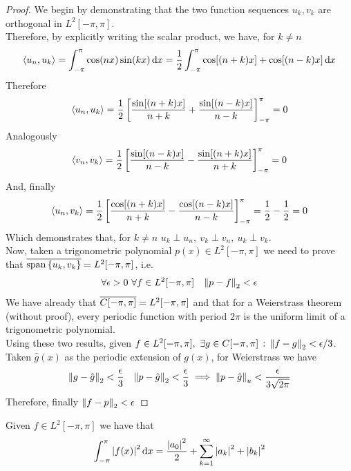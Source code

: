 \documentclass[../complete.tex]{subfiles}
\begin{document}
\begin{proof}
	We begin by demonstrating that the two function sequences $u_k,v_k$ are orthogonal in $L^2[-\pi,\pi]$.\\
	Therefore, by explicitly writing the scalar product, we have, for $k\ne n$
	\begin{equation*}
		\spr{u_n}{u_k}=\int_{-\pi}^{\pi}\cos(nx)\sin(kx)\diff x=\frac{1}{2}\int_{-\pi}^{\pi}\cos[(n+k)x]+\cos[(n-k)x]\diff x
	\end{equation*}
	Therefore
	\begin{equation*}
		\spr{u_n}{u_k}=\frac{1}{2}\left[ \frac{\sin[(n+k)x]}{n+k}+\frac{\sin[(n-k)x]}{n-k} \right]^\pi_{-\pi}=0
	\end{equation*}
	Analogously
	\begin{equation*}
		\spr{v_n}{v_k}=\frac{1}{2}\left[ \frac{\sin[(n-k)x]}{n-k}-\frac{\sin[(n+k)x]}{n+k} \right]^\pi_{-\pi}=0
	\end{equation*}
	And, finally
	\begin{equation*}
		\spr{u_n}{v_k}=\frac{1}{2}\left[ \frac{\cos[(n+k)x]}{n+k}-\frac{\cos[(n-k)x]}{n-k} \right]^{\pi}_{-\pi}=\frac{1}{2}-\frac{1}{2}=0
	\end{equation*}
	Which demonstrates that, for $k\ne n$ $u_k\perp u_n,\ v_k\perp v_n,\ u_k\perp v_k$.\\
	Now, taken a trigonometric polynomial $p(x)\in L^2[-\pi,\pi]$ we need to prove that $\cc{\span\left\{ u_k,v_k \right\}}=L^2[-\pi,\pi]$, i.e.
	\begin{equation*}
		\forall\epsilon>0\ \forall f\in L^2[-\pi,\pi]\quad\pnorm[2]{p-f}<\epsilon
	\end{equation*}
	We have already that $\cc{C[-\pi,\pi]}=L^2[-\pi,\pi]$ and that for a Weierstrass theorem (without proof), every periodic function with period $2\pi$ is the uniform limit of a trigonometric polynomial.\\
	Using these two results, given $f\in L^2[-\pi,\pi],\ \exists g\in C[-\pi,\pi]\st\pnorm[2]{f-g}<\epsilon/3$. Taken $\hat{g}(x)$ as the periodic extension of $g(x)$, for Weierstrass we have
	\begin{equation*}
		\pnorm[2]{g-\hat{g}}<\frac{\epsilon}{3}\quad\pnorm[2]{p-\hat{g}}<\frac{\epsilon}{3}\implies{}\unorm{p-\hat{g}}<\frac{\epsilon}{3\sqrt{2\pi}}
	\end{equation*}
	Therefore, finally $\pnorm[2]{f-p}<\epsilon$
\end{proof}
\begin{thm}
	Given $f\in L^2[-\pi,\pi]$ we have that
	\begin{equation*}
		\int_{-\pi}^{\pi}\abs{f(x)}^2\diff x=\frac{\abs{a_0}^2}{2}+\sum_{k=1}^{\infty}\abs{a_k}^2+\abs{b_k}^2
	\end{equation*}
\end{thm}
\end{document}
